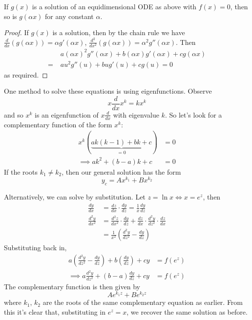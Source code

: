 \documentclass{../../template/note}
\begin{document}
    \begin{proposition}
        If \(g(x)\) is a solution of an equidimensional ODE as above with \(f(x) = 0\), then so is \(g(\alpha x)\) for any constant \(\alpha\).
    \end{proposition}
    
    \begin{proof}
        If \(g(x)\) is a solution, then by the chain rule we have \(\frac{d}{dx}(g(\alpha x)) = \alpha g'(\alpha x)\), \(\frac{d^2}{dx^2}(g(\alpha x)) = \alpha^2 g''(\alpha x)\). Then
        \begin{align*}
            &\; a(\alpha x)^2 g''(\alpha x) + b(\alpha x)g'(\alpha x) + cg(\alpha x) \\
            =& \; au^2g''(u) + bug'(u) + cg(u) = 0
        \end{align*}
        as required.
    \end{proof}
    
    One method to solve these equations is using eigenfunctions. Observe
    \[
        x \frac{d}{dx} x^k = kx^k
    \]
    and so \(x^k\) is an eigenfunction of \(x \frac{d}{dx}\) with eigenvalue \(k\). So let's look for a complementary function of the form \(x^k\):
    \begin{align*}
        x^k(\underbrace{ak(k-1) + bk + c}_{=0}) &= 0 \\
        \implies ak^2 + (b-a)k + c &= 0
    \end{align*}
    If the roots \(k_1 \neq k_2\), then our general solution has the form
    \[
        y_c = Ax^{k_1} + Bx^{k_2}
    \]

    Alternatively, we can solve by substitution. Let \(z = \ln x \iff x = e^z\), then
    \begin{align*}
        \frac{dy}{dx} &= \frac{dz}{dx} \cdot \frac{dy}{dz} = \frac{1}{x} \frac{dy}{dz} \\
        \frac{d^2y}{dx^2} &= \frac{d^2z}{dx^2} \cdot \frac{dy}{dz} + \frac{dz}{dx} \cdot \frac{d^2y}{dz^2} \cdot \frac{dz}{dx} \\
        &= \frac{1}{x^2} \left(\frac{d^2y}{dz^2}-\frac{dy}{dz}\right)
    \end{align*}
    Substituting back in,
    \begin{align*}
        a\left(\frac{d^2y}{dz^2}-\frac{dy}{dz}\right) + b\left(\frac{dy}{dz}\right) + cy &= f(e^z) \\
        \implies a \frac{d^2y}{dz^2} + (b-a) \frac{dy}{dz} + cy &= f(e^z)
    \end{align*}
    The complementary function is then given by
    \[  
        Ae^{k_1z} + Be^{k_2z}
    \]
    where \(k_1\), \(k_2\) are the roots of the same complementary equation as earlier. From this it's clear that, substituting in \(e^z = x\), we recover the same solution as before.  
\end{document}
